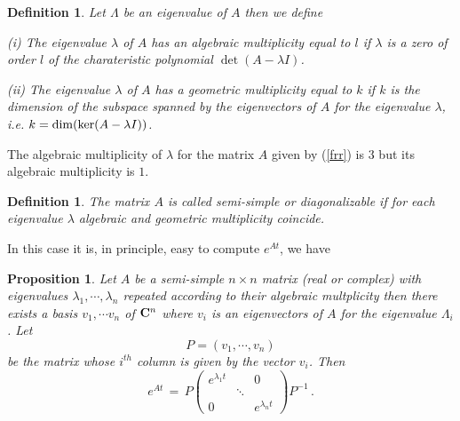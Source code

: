 \documentclass[12pt]{report}
\newcommand{\bC}{{\bf C}}
\newtheorem{prop}[theorem]{Proposition}
\newtheorem{definition}[theorem]{Definition}
\def\eqref#1{(\ref{#1})}
\begin{document}
\begin{definition}{\rm 
 Let $\Lambda$ be an eigenvalue of $A$ then we define

\medskip

\noindent (i) The eigenvalue $\lambda$ of $A$ has an {\em algebraic multiplicity} equal to $l$ 
if $\lambda$ is a zero of order $l$ of the charateristic polynomial $\det(A - \lambda I)$. 

\medskip

\noindent(ii) The eigenvalue $\lambda$ of $A$ has a {\em geometric multiplicity} equal to $k$ 
if $k$ is the dimension of the subspace spanned by the eigenvectors of $A$ for the eigenvalue 
$\lambda$, i.e. $k = {\rm dim}( {\rm ker} (A-\lambda I))$. 
}
\end{definition}

The algebraic multiplicity of $\lambda$ for the matrix $A$ given by \eqref{frr} is $3$ but its algebraic multiplicity is $1$. 


\begin{definition}{\rm The matrix $A$ is called {\em semi-simple} or {\em diagonalizable} if for each eigenvalue $\lambda$ algebraic and geometric multiplicity coincide.
}
\end{definition}

In this case it is, in principle, easy to compute $e^{At}$, we have

\begin{prop} Let $A$ be a semi-simple $n\times n$ matrix (real or complex) with eigenvalues $\lambda_1, \cdots, \lambda_n$ repeated according to their algebraic multplicity then there exists a 
basis  $v_1, \cdots v_n$ of $\bC^n$ where $v_i$ is an eigenvectors of $A$ for the eigenvalue 
$\Lambda_i$.  Let 
\begin{equation}
P=\left( v_1, \cdots, v_n\right)
\end{equation}
be the matrix whose $i^{th}$ column is  given by the vector $v_i$. Then 
\begin{equation}
e^{At} \,=\, P  \left( \begin{array}{ccc} e^{\lambda_1 t} & &0\\ & \ddots & \\
0 & & e^{\lambda_n t}
\end{array}\right) P^{-1} \,.
\end{equation}
\end{prop}
\end{document}
